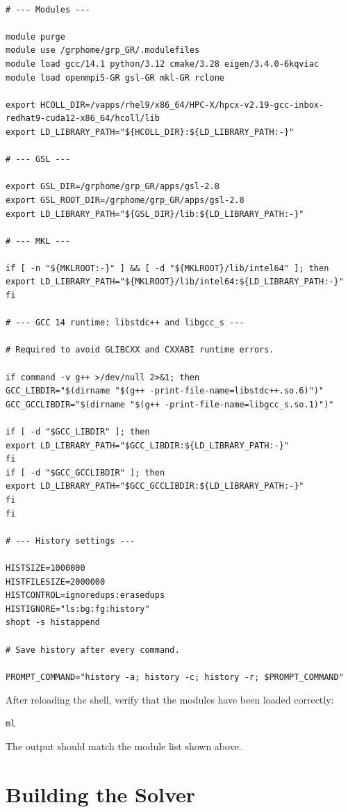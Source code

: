 \begin{verbatim}

# --- Modules ---

module purge
module use /grphome/grp_GR/.modulefiles
module load gcc/14.1 python/3.12 cmake/3.28 eigen/3.4.0-6kqviac
module load openmpi5-GR gsl-GR mkl-GR rclone

export HCOLL_DIR=/vapps/rhel9/x86_64/HPC-X/hpcx-v2.19-gcc-inbox-redhat9-cuda12-x86_64/hcoll/lib
export LD_LIBRARY_PATH="${HCOLL_DIR}:${LD_LIBRARY_PATH:-}"

# --- GSL ---

export GSL_DIR=/grphome/grp_GR/apps/gsl-2.8
export GSL_ROOT_DIR=/grphome/grp_GR/apps/gsl-2.8
export LD_LIBRARY_PATH="${GSL_DIR}/lib:${LD_LIBRARY_PATH:-}"

# --- MKL ---

if [ -n "${MKLROOT:-}" ] && [ -d "${MKLROOT}/lib/intel64" ]; then
export LD_LIBRARY_PATH="${MKLROOT}/lib/intel64:${LD_LIBRARY_PATH:-}"
fi

# --- GCC 14 runtime: libstdc++ and libgcc_s ---

# Required to avoid GLIBCXX and CXXABI runtime errors.

if command -v g++ >/dev/null 2>&1; then
GCC_LIBDIR="$(dirname "$(g++ -print-file-name=libstdc++.so.6)")"
GCC_GCCLIBDIR="$(dirname "$(g++ -print-file-name=libgcc_s.so.1)")"

if [ -d "$GCC_LIBDIR" ]; then
export LD_LIBRARY_PATH="$GCC_LIBDIR:${LD_LIBRARY_PATH:-}"
fi
if [ -d "$GCC_GCCLIBDIR" ]; then
export LD_LIBRARY_PATH="$GCC_GCCLIBDIR:${LD_LIBRARY_PATH:-}"
fi
fi

# --- History settings ---

HISTSIZE=1000000
HISTFILESIZE=2000000
HISTCONTROL=ignoredups:erasedups
HISTIGNORE="ls:bg:fg:history"
shopt -s histappend

# Save history after every command.

PROMPT_COMMAND="history -a; history -c; history -r; $PROMPT_COMMAND"
\end{verbatim}

After reloading the shell, verify that the modules have been loaded correctly:

\begin{verbatim}
ml
\end{verbatim}

The output should match the module list shown above.

\section{Building the Solver}

